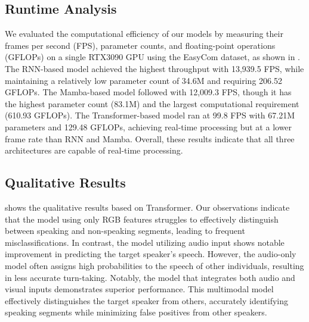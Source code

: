 \subsection{Runtime Analysis}
We evaluated the computational efficiency of our models by measuring their frames per second (FPS), parameter counts, and floating-point operations (GFLOPs) on a single RTX3090 GPU using the EasyCom dataset, as shown in . The RNN-based model achieved the highest throughput with 13,939.5 FPS, while maintaining a relatively low parameter count of 34.6M and requiring 206.52 GFLOPs. The Mamba-based model followed with 12,009.3 FPS, though it has the highest parameter count (83.1M) and the largest computational requirement (610.93 GFLOPs). The Transformer-based model ran at 99.8 FPS with 67.21M parameters and 129.48 GFLOPs, achieving real-time processing but at a lower frame rate than RNN and Mamba. Overall, these results indicate that all three architectures are capable of real-time processing.





\subsection {Qualitative Results}
 shows the qualitative results based on Transformer. Our observations indicate that the model using only RGB features struggles to effectively distinguish between speaking and non-speaking segments, leading to frequent misclassifications. In contrast, the model utilizing audio input shows notable improvement in predicting the target speaker's speech. However, the audio-only model often assigns high probabilities to the speech of other individuals, resulting in less accurate turn-taking. Notably, the model that integrates both audio and visual inputs demonstrates superior performance. This multimodal model effectively distinguishes the target speaker from others, accurately identifying speaking segments while minimizing false positives from other speakers.





